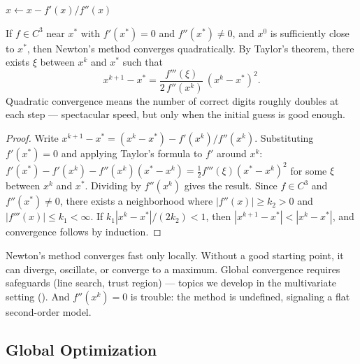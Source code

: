 \begin{algorithm}
	\caption{Newton's Method (NM)}
	\begin{algorithmic}[1]
				\State $x \gets x - f'(x) / f''(x)$
			\EndWhile
		\EndProcedure
	\end{algorithmic}
\end{algorithm}

\begin{thm}\label{thm:newton-conv}
	If $f \in C^3$ near $x^*$ with $f'(x^*) = 0$ and $f''(x^*) \neq 0$, and $x^0$ is sufficiently close to $x^*$, then Newton's method converges quadratically.
	By Taylor's theorem, there exists $\xi$ between $x^k$ and $x^*$ such that
	\begin{equation}\label{eq:newton-error}
		x^{k+1} - x^* = \frac{f'''(\xi)}{2\, f''(x^k)}\, (x^k - x^*)^2.
	\end{equation}
	Quadratic convergence means the number of correct digits roughly doubles at each step --- spectacular speed, but only when the initial guess is good enough.
\end{thm}

\begin{proof}
	Write $x^{k+1} - x^* = (x^k - x^*) - f'(x^k)/f''(x^k)$.
	Substituting $f'(x^*) = 0$ and applying Taylor's formula to $f'$ around $x^k$:
	$f'(x^*) - f'(x^k) - f''(x^k)(x^* - x^k) = \frac{1}{2} f'''(\xi)(x^* - x^k)^2$
	for some $\xi$ between $x^k$ and $x^*$.
	Dividing by $f''(x^k)$ gives the result.
	Since $f \in C^3$ and $f''(x^*) \neq 0$, there exists a neighborhood where $|f''(x)| \geq k_2 > 0$ and $|f'''(x)| \leq k_1 < \infty$.
	If $k_1 |x^k - x^*| / (2 k_2) < 1$, then $|x^{k+1} - x^*| < |x^k - x^*|$, and convergence follows by induction.
\end{proof}

Newton's method converges fast only locally.
Without a good starting point, it can diverge, oscillate, or converge to a maximum.
Global convergence requires safeguards (line search, trust region) --- topics we develop in the multivariate setting ().
And $f''(x^k) = 0$ is trouble: the method is undefined, signaling a flat second-order model.


\subsection{Global Optimization}\label{ssec:global-opt}

